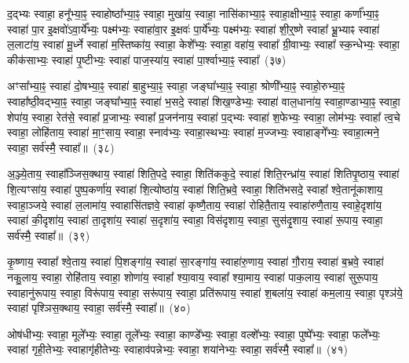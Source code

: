 {\anuvakamend[{पु॒रु॒रूपा॑य॒ स्वाहा॒ दश॑ च}]}%

द॒द्भ्यः स्वाहा॒ हनू᳚भ्या॒ꣴ॒ स्वाहोष्ठा᳚भ्या॒ꣴ॒ स्वाहा॒ मुखा॑य॒ स्वाहा॒ नासि॑काभ्या॒ꣴ॒ स्वाहा॒क्षीभ्या॒ꣴ॒ स्वाहा॒ कर्णा᳚भ्या॒ꣴ॒ स्वाहा॑ पा॒र इ॒क्षवो॑\-ऽवा॒र्ये᳚भ्यः॒ पक्ष्म॑भ्यः॒ स्वाहा॑वा॒र इ॒क्षवः॑ पा॒र्ये᳚भ्यः॒ पक्ष्म॑भ्यः॒ स्वाहा॑ शी॒र्॒\mbox{}ष्णे स्वाहा᳚ भ्रू॒भ्याꣴ स्वाहा॑ ल॒लाटा॑य॒ स्वाहा॑ मू॒र्ध्ने स्वाहा॑ म॒स्तिष्का॑य॒ स्वाहा॒ केशे᳚भ्यः॒ स्वाहा॒ वहा॑य॒ स्वाहा᳚ ग्री॒वाभ्यः॒ स्वाहा᳚ स्क॒न्धेभ्यः॒ स्वाहा॒ कीक॑साभ्यः॒ स्वाहा॑ पृ॒ष्टीभ्यः॒ स्वाहा॑ पाज॒स्या॑य॒ स्वाहा॑ पा॒र्श्वाभ्या॒ꣴ॒ स्वाहा᳚~(३७)

अꣳसा᳚भ्या॒ꣴ॒ स्वाहा॑ दो॒षभ्या॒ꣴ॒ स्वाहा॑ बा॒हुभ्या॒ꣴ॒ स्वाहा॒ जङ्घा᳚भ्या॒ꣴ॒ स्वाहा॒ श्रोणी᳚भ्या॒ꣴ॒ स्वाहो॒रुभ्या॒ꣴ॒ स्वाहा᳚ष्ठी॒वद्भ्या॒ꣴ॒ स्वाहा॒ जङ्घा᳚भ्या॒ꣴ॒ स्वाहा॑ भ॒सदे॒ स्वाहा॑ शिख॒ण्डेभ्यः॒ स्वाहा॑ वाल॒धाना॑य॒ स्वाहा॒ण्डाभ्या॒ꣴ॒ स्वाहा॒ शेपा॑य॒ स्वाहा॒ रेत॑से॒ स्वाहा᳚ प्र॒जाभ्यः॒ स्वाहा᳚ प्र॒जन॑नाय॒ स्वाहा॑ प॒द्भ्यः स्वाहा॑ श॒फेभ्यः॒ स्वाहा॒ लोम॑भ्यः॒ स्वाहा᳚ त्व॒चे स्वाहा॒ लोहि॑ताय॒ स्वाहा॑ मा॒ꣳ॒साय॒ स्वाहा॒ स्नाव॑भ्यः॒ स्वाहा॒स्थभ्यः॒ स्वाहा॑ म॒ज्जभ्यः॒ स्वाहाङ्गे᳚भ्यः॒ स्वाहा॒त्मने॒ स्वाहा॒ सर्व॑स्मै॒ स्वाहा᳚॥~(३८)

{\anuvakamend[{पा॒र्श्वाभ्या॒ꣴ॒ स्वाहा॑ म॒ज्जभ्यः॒ स्वाहा॒ षट्च॑}]}%

अ॒ञ्ज्ये॒ताय॒ स्वाहा᳚ञ्जिस॒क्थाय॒ स्वाहा॑ शिति॒पदे॒ स्वाहा॒ शिति॑ककुदे॒ स्वाहा॑ शिति॒रन्ध्रा॑य॒ स्वाहा॑ शितिपृ॒ष्ठाय॒ स्वाहा॑ शि॒त्यꣳसा॑य॒ स्वाहा॑ पुष्प॒कर्णा॑य॒ स्वाहा॑ शि॒त्योष्ठा॑य॒ स्वाहा॑ शिति॒भ्रवे॒ स्वाहा॒ शिति॑भसदे॒ स्वाहा᳚ श्वे॒तानू॑काशाय॒ स्वाहा॒ञ्जये॒ स्वाहा॑ ल॒लामा॑य॒ स्वाहासि॑तज्ञवे॒ स्वाहा॑ कृष्णै॒ताय॒ स्वाहा॑ रोहितै॒ताय॒ स्वाहा॑रुणै॒ताय॒ स्वाहे॒दृशा॑य॒ स्वाहा॑ की॒दृशा॑य॒ स्वाहा॑ ता॒दृशा॑य॒ स्वाहा॑ स॒दृशा॑य॒ स्वाहा॒ विस॑दृशाय॒ स्वाहा॒ सुस॑दृ॒शाय॒ स्वाहा॑ रू॒पाय॒ स्वाहा॒ सर्व॑स्मै॒ स्वाहा᳚॥~(३९)

{\anuvakamend[{रू॒पाय॒ स्वाहा॒ द्वे च॑}]}%

कृ॒ष्णाय॒ स्वाहा᳚ श्वे॒ताय॒ स्वाहा॑ पि॒शङ्गा॑य॒ स्वाहा॑ सा॒रङ्गा॑य॒ स्वाहा॑रु॒णाय॒ स्वाहा॑ गौ॒राय॒ स्वाहा॑ ब॒भ्रवे॒ स्वाहा॑ नकु॒लाय॒ स्वाहा॒ रोहि॑ताय॒ स्वाहा॒ शोणा॑य॒ स्वाहा᳚ श्या॒वाय॒ स्वाहा᳚ श्या॒माय॒ स्वाहा॑ पाक॒लाय॒ स्वाहा॑ सुरू॒पाय॒ स्वाहानु॑रूपाय॒ स्वाहा॒ विरू॑पाय॒ स्वाहा॒ सरू॑पाय॒ स्वाहा॒ प्रति॑रूपाय॒ स्वाहा॑ श॒बला॑य॒ स्वाहा॑ कम॒लाय॒ स्वाहा॒ पृश्ञ॑ये॒ स्वाहा॑ पृश्ञिस॒क्थाय॒ स्वाहा॒ सर्व॑स्मै॒ स्वाहा᳚॥~(४०)

{\anuvakamend[{कृ॒ष्णाय॒ षट्च॑त्वारिꣳशत्}]}%

ओष॑धीभ्यः॒ स्वाहा॒ मूले᳚भ्यः॒ स्वाहा॒ तूले᳚भ्यः॒ स्वाहा॒ काण्डे᳚भ्यः॒ स्वाहा॒ वल्\mbox{}शे᳚भ्यः॒ स्वाहा॒ पुष्पे᳚भ्यः॒ स्वाहा॒ फले᳚भ्यः॒ स्वाहा॑ गृही॒तेभ्यः॒ स्वाहागृ॑हीतेभ्यः॒ स्वाहाव॑पन्नेभ्यः॒ स्वाहा॒ शया॑नेभ्यः॒ स्वाहा॒ सर्व॑स्मै॒ स्वाहा᳚॥~(४१)

